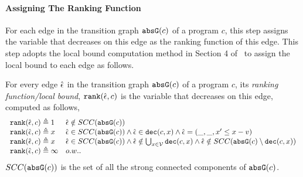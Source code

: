 
  \paragraph{Assigning The Ranking Function}
  For each edge in the transition graph $\mathtt{abs}{\mathtt{G}}(c)$ of a program $c$,
  this step assigns the variable that decreases on this edge as the ranking function of this edge.
  This step adopts the local bound computation method in Section 4 of~\cite{SinnZV17} to assign the local bound to each edge as follows.
  \begin{defn}
  \label{def:ranking_gen}
  For every edge $\hat{\mathtt{\epsilon}{}}$ in the transition graph $\mathtt{abs}{\mathtt{G}}(c)$ of a program $c$,
  its \emph{ranking function/local bound}, $\mathtt{rank}(\hat{\mathtt{\epsilon}{}}, c)$
  is the variable that decreases on this edge, computed as follows,
{\small
\[ 
\begin{array}{ll}
  \mathtt{rank}(\hat{\mathtt{\epsilon}{}}, c) \triangleq 1 
  & \hat{\mathtt{\epsilon}{}} \notin SCC(\mathtt{abs}{\mathtt{G}}(c))
  \\
  \mathtt{rank}(\hat{\mathtt{\epsilon}{}}, c) \triangleq x
  & \hat{\mathtt{\epsilon}{}} \in SCC(\mathtt{abs}{\mathtt{G}}(c)) \land \hat{\mathtt{\epsilon}{}} \in \mathtt{dec}(c, x) \land  \hat{\mathtt{\epsilon}{}} = (\_, \_ , x' \leq x - v) \\
  \mathtt{rank}(\hat{\mathtt{\epsilon}{}}, c) \triangleq x
  & \hat{\mathtt{\epsilon}{}} \in SCC(\mathtt{abs}{\mathtt{G}}(c)) \land 
  \hat{\mathtt{\epsilon}{}}  \notin \bigcup_{x \in \mathcal{V}} \mathtt{dec}(c, x)
  \land \hat{\mathtt{\epsilon}{}} \notin SCC(\mathtt{abs}{\mathtt{G}}(c) \setminus \mathtt{dec}(c, x))\\
  \mathtt{rank}(\hat{\mathtt{\epsilon}{}}, c) \triangleq \infty
  & o.w..
\end{array}
\]
}
$SCC(\mathtt{abs}{\mathtt{G}}(c))$ is the set of all the strong connected components of $\mathtt{abs}{\mathtt{G}}(c)$.
  \end{defn}
